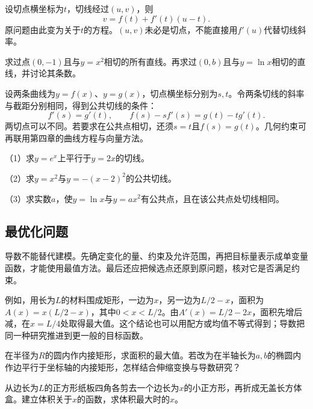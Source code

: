 设切点横坐标为\(t\)，切线经过\((u,v)\)，则
\begin{equation}\label{eq:calculus-tangent-through-point}
 v=f(t)+f'(t)(u-t).
\end{equation}
原问题由此变为关于\(t\)的方程。\((u,v)\)未必是切点，不能直接用\(f'(u)\)代替切线斜率。

\begin{example}
求过点\((0,-1)\)且与\(y=x^2\)相切的所有直线。再求过\((0,b)\)且与\(y=\ln x\)相切的直线，并讨论其条数。
\end{example}

设两条曲线为\(y=f(x)\)、\(y=g(x)\)，切点横坐标分别为\(s,t\)。令两条切线的斜率与截距分别相同，得到公共切线的条件：
\begin{equation*}
 f'(s)=g'(t),\qquad f(s)-sf'(s)=g(t)-tg'(t).
\end{equation*}
两切点可以不同。若要求在公共点相切，还须\(s=t\)且\(f(s)=g(t)\)。几何约束可再联用第四章的曲线方程与向量方法。

\begin{exercise}
\mbox{}\par\nobreak

（1）求\(y=e^x\)上平行于\(y=2x\)的切线。

（2）求\(y=x^2\)与\(y=-(x-2)^2\)的公共切线。

（3）求实数\(a\)，使\(y=\ln x\)与\(y=ax^2\)有公共点，且在该公共点处切线相同。
\end{exercise}

\subsection{最优化问题}

导数不能替代建模。先确定变化的量、约束及允许范围，再把目标量表示成单变量函数，才能使用最值方法。最后还应把候选点还原到原问题，核对它是否满足约束。

例如，用长为\(L\)的材料围成矩形，一边为\(x\)，另一边为\(L/2-x\)，面积为\(A(x)=x(L/2-x)\)，其中\(0<x<L/2\)。由\(A'(x)=L/2-2x\)，面积先增后减，在\(x=L/4\)处取得最大值。这个结论也可以用配方或均值不等式得到；导数把同一种研究推进到更一般的目标函数。

\begin{example}
在半径为\(R\)的圆内作内接矩形，求面积的最大值。若改为在半轴长为\(a,b\)的椭圆内作边平行于坐标轴的内接矩形，怎样结合伸缩变换与导数研究？
\end{example}

\begin{example}
从边长为\(L\)的正方形纸板四角各剪去一个边长为\(x\)的小正方形，再折成无盖长方体盒。建立体积关于\(x\)的函数，求体积最大时的\(x\)。
\end{example}

